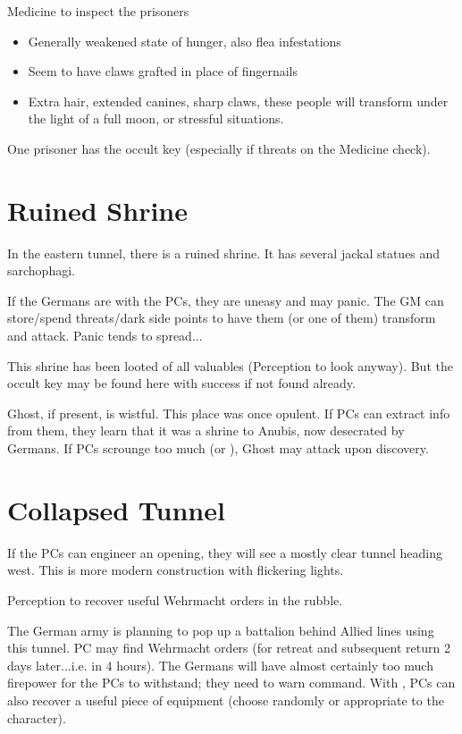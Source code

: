 \documentclass{book}
\newcommand{\df}{\DifficultyDie }
\newcommand{\stb}{\SetbackDie }
\newcommand{\ch}{\ChallengeDie }
\begin{document}
\begin{multicols}{2}
\df\df\stb\stb Medicine to inspect the prisoners
    \begin{itemize}
        \item \Success Generally weakened state of hunger, also flea infestations
        \item \Advantage\Advantage Seem to have claws grafted in place of fingernails
        \item \Triumph Extra hair, extended canines, sharp claws, these people will transform under the light of a full moon, or stressful situations.
    \end{itemize}

One prisoner has the occult key (especially if threats on the Medicine check).

\section{Ruined Shrine}

In the eastern tunnel, there is a ruined shrine.  It has several jackal statues and sarchophagi.

If the Germans are with the PCs, they are uneasy and may panic.  The GM can store/spend threats/dark side points to have them (or one of them) transform and attack.  Panic tends to spread...

This shrine has been looted of all valuables (\ch\df\stb\stb Perception to look anyway).  But the occult key may be found here with success if not found already.

Ghost, if present, is wistful.  This place was once opulent.  If PCs can extract info from them, they learn that it was a shrine to Anubis, now desecrated by Germans.  If PCs scrounge too much (\Threat\Threat\Threat or \Despair), Ghost may attack upon discovery.


\section{Collapsed Tunnel}

If the PCs can engineer an opening, they will see a mostly clear tunnel heading west.  This is more modern construction with flickering lights.

\df\df Perception to recover useful Wehrmacht orders in the rubble.

The German army is planning to pop up a battalion behind Allied lines using this tunnel.  PC may find Wehrmacht orders (for retreat and subsequent return 2 days later...i.e. in 4 hours).  The Germans will have almost certainly too much firepower for the PCs to withstand; they need to warn command.  With \Advantage\Advantage, PCs can also recover a useful piece of equipment (choose randomly or appropriate to the character).


\end{multicols}
\end{document}
